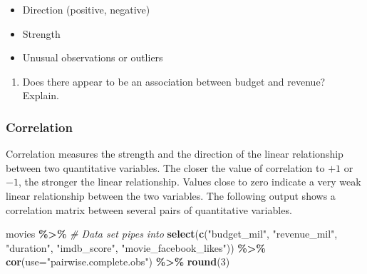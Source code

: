 \documentclass[
]{report}
\newenvironment{Shaded}{\begin{snugshade}}{\end{snugshade}}
\newcommand{\CommentTok}[1]{\textcolor[rgb]{0.56,0.35,0.01}{\textit{#1}}}
\newcommand{\DataTypeTok}[1]{\textcolor[rgb]{0.13,0.29,0.53}{#1}}
\newcommand{\DecValTok}[1]{\textcolor[rgb]{0.00,0.00,0.81}{#1}}
\newcommand{\KeywordTok}[1]{\textcolor[rgb]{0.13,0.29,0.53}{\textbf{#1}}}
\newcommand{\NormalTok}[1]{#1}
\newcommand{\OperatorTok}[1]{\textcolor[rgb]{0.81,0.36,0.00}{\textbf{#1}}}
\newcommand{\StringTok}[1]{\textcolor[rgb]{0.31,0.60,0.02}{#1}}
\providecommand{\tightlist}{%
  \setlength{\itemsep}{0pt}\setlength{\parskip}{0pt}}
\begin{document}
\vspace{.4in}

\begin{itemize}
\tightlist
\item
  Direction (positive, negative)
\end{itemize}

\vspace{.4in}

\begin{itemize}
\tightlist
\item
  Strength
\end{itemize}

\vspace{.4in}

\begin{itemize}
\tightlist
\item
  Unusual observations or outliers
\end{itemize}

\vspace{.4in}

\begin{enumerate}
\def\labelenumi{\arabic{enumi}.}
\setcounter{enumi}{4}
\tightlist
\item
  Does there appear to be an association between budget and revenue? Explain.
\end{enumerate}

\vspace{1in}

\newpage

\hypertarget{correlation}{%
\subsubsection*{Correlation}\label{correlation}}

Correlation measures the strength and the direction of the linear relationship between two quantitative variables. The closer the value of correlation to \(+1\) or \(-1\), the stronger the linear relationship. Values close to zero indicate a very weak linear relationship between the two variables. The following output shows a correlation matrix between several pairs of quantitative variables.

\begin{Shaded}
\begin{Highlighting}[]
\NormalTok{movies }\OperatorTok{\%\textgreater{}\%}\StringTok{  }\CommentTok{\# Data set pipes into}
\StringTok{  }\KeywordTok{select}\NormalTok{(}\KeywordTok{c}\NormalTok{(}\StringTok{"budget\_mil"}\NormalTok{, }\StringTok{"revenue\_mil"}\NormalTok{, }
           \StringTok{"duration"}\NormalTok{, }\StringTok{"imdb\_score"}\NormalTok{, }
           \StringTok{"movie\_facebook\_likes"}\NormalTok{)) }\OperatorTok{\%\textgreater{}\%}
\StringTok{  }\KeywordTok{cor}\NormalTok{(}\DataTypeTok{use=}\StringTok{"pairwise.complete.obs"}\NormalTok{) }\OperatorTok{\%\textgreater{}\%}
\StringTok{  }\KeywordTok{round}\NormalTok{(}\DecValTok{3}\NormalTok{)}
\end{Highlighting}
\end{Shaded}
\end{document}
